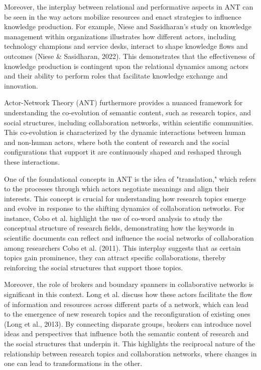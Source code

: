 \documentclass[12pt]{article}
\begin{document}
Moreover, the interplay between relational and performative aspects in ANT can be seen in the way actors mobilize resources and enact strategies to influence knowledge production. For example, Niese and Sasidharan's study on knowledge management within organizations illustrates how different actors, including technology champions and service desks, interact to shape knowledge flows and outcomes (Niese \& Sasidharan, 2022). This demonstrates that the effectiveness of knowledge production is contingent upon the relational dynamics among actors and their ability to perform roles that facilitate knowledge exchange and innovation.

Actor-Network Theory (ANT) furthermore provides a nuanced framework for understanding the co-evolution of semantic content, such as research topics, and social structures, including collaboration networks, within scientific communities. This co-evolution is characterized by the dynamic interactions between human and non-human actors, where both the content of research and the social configurations that support it are continuously shaped and reshaped through these interactions.

One of the foundational concepts in ANT is the idea of "translation," which refers to the processes through which actors negotiate meanings and align their interests. This concept is crucial for understanding how research topics emerge and evolve in response to the shifting dynamics of collaboration networks. For instance, Cobo et al. highlight the use of co-word analysis to study the conceptual structure of research fields, demonstrating how the keywords in scientific documents can reflect and influence the social networks of collaboration among researchers Cobo et al. (2011). This interplay suggests that as certain topics gain prominence, they can attract specific collaborations, thereby reinforcing the social structures that support those topics.

Moreover, the role of brokers and boundary spanners in collaborative networks is significant in this context. Long et al. discuss how these actors facilitate the flow of information and resources across different parts of a network, which can lead to the emergence of new research topics and the reconfiguration of existing ones (Long et al., 2013). By connecting disparate groups, brokers can introduce novel ideas and perspectives that influence both the semantic content of research and the social structures that underpin it. This highlights the reciprocal nature of the relationship between research topics and collaboration networks, where changes in one can lead to transformations in the other.
\end{document}
